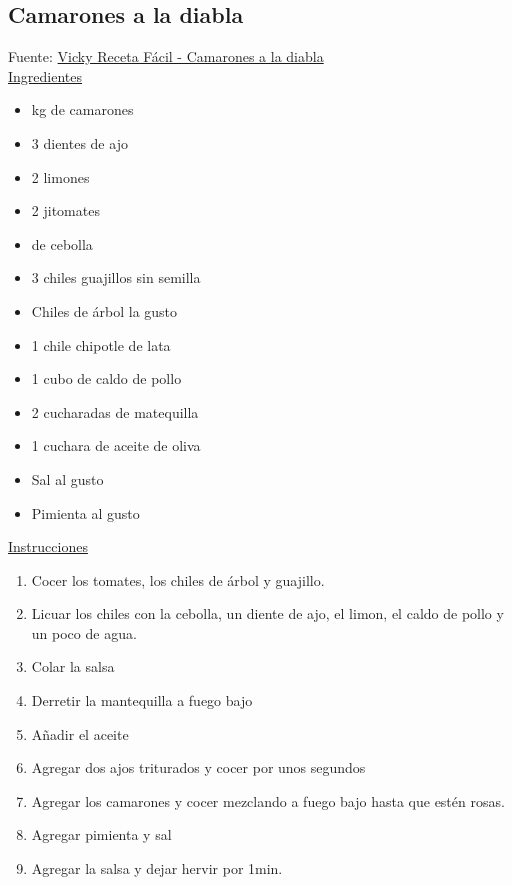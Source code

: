 \subsection{Camarones a la diabla}

Fuente: \href{https://www.youtube.com/watch?v=gDJC0GQnj7A}{Vicky Receta Fácil - Camarones a la diabla}
\\
\underline{Ingredientes}
\begin{itemize}
\item {} kg de camarones
\item 3 dientes de ajo
\item 2 limones
\item 2 jitomates
\item {} de cebolla
\item 3 chiles guajillos sin semilla
\item Chiles de árbol la gusto
\item 1 chile chipotle de lata
\item 1 cubo de caldo de pollo
\item 2 cucharadas de matequilla
\item 1 cuchara de aceite de oliva
\item Sal al gusto
\item Pimienta al gusto
\end{itemize}

\underline{Instrucciones}

\begin{enumerate}
\item Cocer los tomates, los chiles de árbol y guajillo.
\item Licuar los chiles con la cebolla, un diente de ajo, el limon, el caldo de pollo y un poco de agua.
\item Colar la salsa
\item Derretir la mantequilla a fuego bajo
\item Añadir el aceite
\item Agregar dos ajos triturados y cocer por unos segundos
\item Agregar los camarones y cocer mezclando a fuego bajo hasta que estén rosas.
\item Agregar pimienta y sal
\item Agregar la salsa y dejar hervir por 1min.
\end{enumerate}